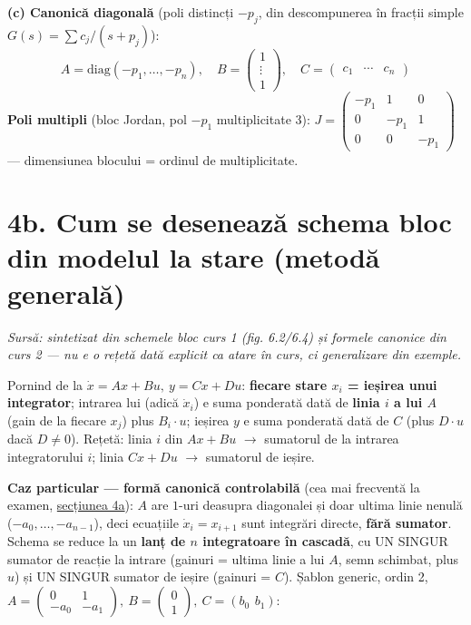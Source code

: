 \documentclass[10pt,a4paper]{article}
\newcommand{\srcnote}[1]{{\footnotesize\color{gray!55!black}\textit{Sursă: #1}}\par}
\begin{document}
\textbf{(c) Canonică diagonală} (poli distincți $-p_j$, din descompunerea în fracții simple $G(s)=\sum c_j/(s+p_j)$):
$$A=\mathrm{diag}(-p_1,\dots,-p_n),\quad B=\begin{pmatrix}1\\\vdots\\1\end{pmatrix},\quad C=\begin{pmatrix}c_1&\cdots&c_n\end{pmatrix}$$
\textbf{Poli multipli} (bloc Jordan, pol $-p_1$ multiplicitate 3): $J=\begin{pmatrix}-p_1&1&0\\0&-p_1&1\\0&0&-p_1\end{pmatrix}$ — dimensiunea blocului = ordinul de multiplicitate.

\section*{4b. Cum se desenează schema bloc din modelul la stare (metodă generală)}\label{sec:4b}
\srcnote{sintetizat din schemele bloc curs 1 (fig. 6.2/6.4) și formele canonice din curs 2 — nu e o rețetă dată explicit ca atare în curs, ci generalizare din exemple.}
Pornind de la $\dot x=Ax+Bu,\ y=Cx+Du$: \textbf{fiecare stare $x_i$ = ieșirea unui integrator}; intrarea lui (adică $\dot x_i$) e suma ponderată dată de \textbf{linia $i$ a lui $A$} (gain de la fiecare $x_j$) plus $B_i\cdot u$; ieșirea $y$ e suma ponderată dată de $C$ (plus $D\cdot u$ dacă $D\ne0$). Rețetă: linia $i$ din $Ax{+}Bu$ $\to$ sumatorul de la intrarea integratorului $i$; linia $Cx{+}Du$ $\to$ sumatorul de ieșire.

\textbf{Caz particular — formă canonică controlabilă} (cea mai frecventă la examen, \hyperref[sec:4]{secțiunea 4a}): $A$ are $1$-uri deasupra diagonalei și doar ultima linie nenulă ($-a_0,\dots,-a_{n-1}$), deci ecuațiile $\dot x_i=x_{i+1}$ sunt integrări directe, \textbf{fără sumator}. Schema se reduce la un \textbf{lanț de $n$ integratoare în cascadă}, cu UN SINGUR sumator de reacție la intrare (gainuri = ultima linie a lui $A$, semn schimbat, plus $u$) și UN SINGUR sumator de ieșire (gainuri = $C$). Șablon generic, ordin 2, $A=\begin{pmatrix}0&1\\-a_0&-a_1\end{pmatrix},\ B=\begin{pmatrix}0\\1\end{pmatrix},\ C=(b_0\ \,b_1)$:
\end{document}
